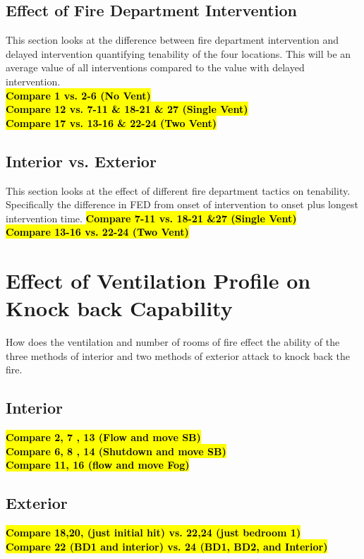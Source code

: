 \documentclass[12pt,oneside]{book}
\begin{document}
\clearpage

\subsection{Effect of Fire Department Intervention}
This section looks at the difference between fire department intervention and delayed intervention quantifying tenability of the four locations. This will be an average value of all interventions compared to the value with delayed intervention. \\
\bf{\hl{Compare 1 vs. 2-6 (No Vent)}} \\
\bf{\hl{Compare 12 vs. 7-11 \& 18-21 \& 27 (Single Vent)}} \\
\bf{\hl{Compare 17 vs. 13-16 \& 22-24 (Two Vent)}} \\

\subsection{Interior vs. Exterior}
This section looks at the effect of different fire department tactics on tenability. Specifically the difference in FED from onset of intervention to onset plus longest intervention time. 
\bf{\hl{Compare 7-11 vs. 18-21 \&27 (Single Vent)}} \\
\bf{\hl{Compare 13-16 vs. 22-24 (Two Vent)}} \\

\section{Effect of Ventilation Profile on Knock back Capability}
How does the ventilation and number of rooms of fire effect the ability of the three methods of interior and two methods of exterior attack to knock back the fire. 

\subsection{Interior}
\bf{\hl{Compare 2, 7 , 13 (Flow and move SB)}} \\
\bf{\hl{Compare 6, 8 , 14 (Shutdown and move SB)}} \\
\bf{\hl{Compare 11, 16 (flow and move Fog)}} \\

\subsection{Exterior}
\bf{\hl{Compare 18,20, (just initial hit) vs. 22,24 (just bedroom 1)}} \\
\bf{\hl{Compare 22 (BD1 and interior) vs. 24 (BD1, BD2, and Interior)}} \\
\end{document}

